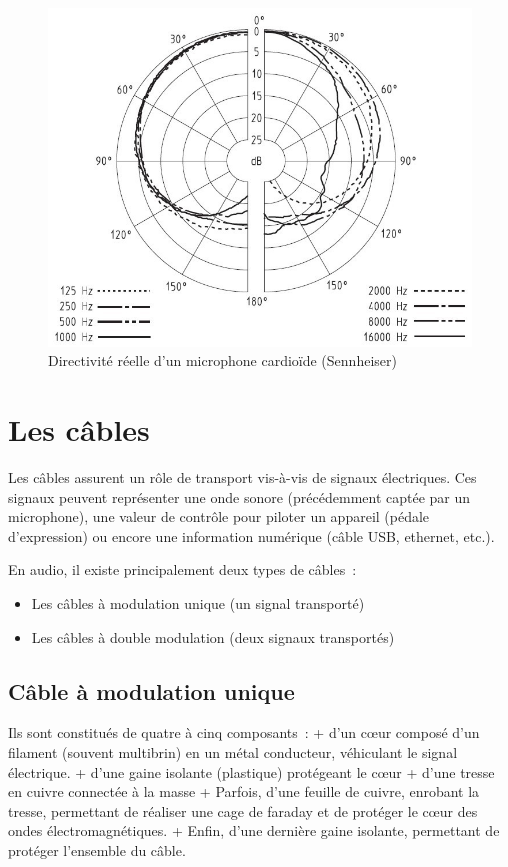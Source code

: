 \documentclass[
]{book}
\providecommand{\tightlist}{%
  \setlength{\itemsep}{0pt}\setlength{\parskip}{0pt}}
\begin{document}
\begin{figure}

{\centering \includegraphics[width=0.5\linewidth]{_resources/image_15} 

}

\caption{Directivité réelle d'un microphone cardioïde (Sennheiser)}\label{fig:unnamed-chunk-16}
\end{figure}

\hypertarget{les-cuxe2bles}{%
\chapter{Les câbles}\label{les-cuxe2bles}}

Les câbles assurent un rôle de transport vis-à-vis de signaux électriques. Ces signaux peuvent représenter une onde sonore (précédemment captée par un microphone), une valeur de contrôle pour piloter un appareil (pédale d'expression) ou encore une information numérique (câble USB, ethernet, etc.).

En audio, il existe principalement deux types de câbles~:

\begin{itemize}
\tightlist
\item
  Les câbles à modulation unique (un signal transporté)
\item
  Les câbles à double modulation (deux signaux transportés)
\end{itemize}

\hypertarget{cuxe2ble-uxe0-modulation-unique}{%
\section{Câble à modulation unique}\label{cuxe2ble-uxe0-modulation-unique}}

Ils sont constitués de quatre à cinq composants~:
+ d'un cœur composé d'un filament (souvent multibrin) en un métal conducteur, véhiculant le signal électrique.
+ d'une gaine isolante (plastique) protégeant le cœur
+ d'une tresse en cuivre connectée à la masse
+ Parfois, d'une feuille de cuivre, enrobant la tresse, permettant de réaliser une cage de faraday et de protéger le cœur des ondes électromagnétiques.
+ Enfin, d'une dernière gaine isolante, permettant de protéger l'ensemble du câble.
\end{document}
